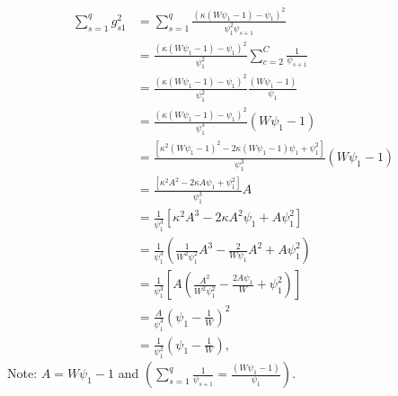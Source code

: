 \begin{equation}
    \begin{aligned}
\sum_{s=1}^q g_{s1}^2 &= \sum_{s=1}^q \frac{\left(\kappa(W \psi_1 - 1) - \psi_1\right)^2}{\psi_1^2 \psi_{s+1}} \\
&= \frac{\left(\kappa(W \psi_1 - 1) - \psi_1\right)^2}{\psi_1^2} \sum_{c=2}^C \frac{1}{\psi_{s+1}} \\
&= \frac{\left(\kappa(W \psi_1 - 1) - \psi_1\right)^2}{\psi_1^2} \frac{(W \psi_1 - 1)}{\psi_1} \\
&= \frac{\left(\kappa(W \psi_1 - 1) - \psi_1\right)^2}{\psi_1^3} (W \psi_1 - 1) \\
&= \frac{ \left[ \kappa^2 (W \psi_1 - 1)^2 - 2 \kappa (W \psi_1 - 1) \psi_1 + \psi_1^2 \right] }{ \psi_1^3 } (W \psi_1 - 1) \\
&= \frac{ \left[ \kappa^2 A^2 - 2 \kappa A \psi_1 + \psi_1^2 \right] }{ \psi_1^3 } A \\
&= \frac{1}{\psi_1^3} \left[ \kappa^2 A^3 - 2 \kappa A^2 \psi_1 + A \psi_1^2 \right] \\
&= \frac{1}{\psi_1^3} \left( \frac{1}{W^2 \psi_1^2} A^3 - \frac{2}{W \psi_1} A^2 + A \psi_1^2 \right)\\
&= \frac{1}{\psi_1^3} \left[ A \left( \frac{A^2}{W^2 \psi_1^2} - \frac{2 A \psi_1}{W} + \psi_1^2 \right) \right]\\
&= \frac{A}{\psi_1^3} \left( \psi_1 - \frac{1}{W} \right)^2\\
&= \frac{1}{\psi_1^2} \left(\psi_1 - \frac{1}{W}\right),
\end{aligned}
\nonumber
\end{equation}
Note: $A = W \psi_1 - 1 $ and $\left( \sum_{s=1}^q \frac{1}{\psi_{s+1}} =  \frac{(W \psi_1 - 1)}{\psi_1} \right)$. 

